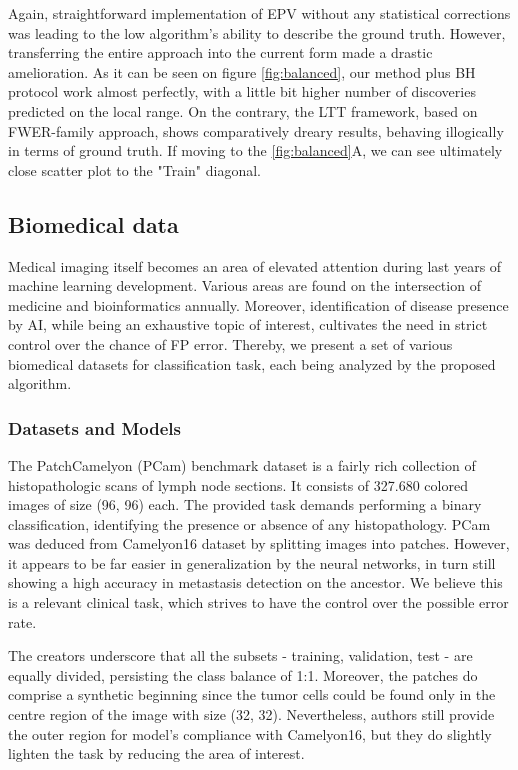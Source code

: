 \documentclass{article}
\begin{document}
Again, straightforward implementation of EPV without any statistical corrections was leading to the low algorithm's ability to describe the ground truth. However, transferring the entire approach into the current form made a drastic amelioration. As it can be seen on figure \ref{fig:balanced}, our method plus BH protocol work almost perfectly, with a little bit higher number of discoveries predicted on the local range. On the contrary, the LTT framework, based on FWER-family approach, shows comparatively dreary results, behaving illogically in terms of ground truth. If moving to the \ref{fig:balanced}A, we can see ultimately close scatter plot to the "Train" diagonal.

\subsection{Biomedical data}

Medical imaging itself becomes an area of elevated attention during last years of machine learning development. Various areas are found on the intersection of medicine and bioinformatics annually. Moreover, identification of disease presence by AI, while being an exhaustive topic of interest, cultivates the need in strict control over the chance of FP error. Thereby, we present a set of various biomedical datasets for classification task, each being analyzed by the proposed algorithm.

\subsubsection{Datasets and Models}

The PatchCamelyon (PCam) benchmark dataset is a fairly rich collection of histopathologic scans of lymph node sections. It consists of 327.680 colored images of size (96, 96) each. The provided task demands performing a binary classification, identifying the presence or absence of any histopathology. PCam was deduced from Camelyon16 dataset by splitting images into patches. However, it appears to be far easier in generalization by the neural networks, in turn still showing a high accuracy in metastasis detection on the ancestor. We believe this is a relevant clinical task, which strives to have the control over the possible error rate.

The creators underscore that all the subsets - training, validation, test - are equally divided, persisting the class balance of 1:1. Moreover, the patches do comprise a synthetic beginning since the tumor cells could be found only in the centre region of the image with size (32, 32). Nevertheless, authors still provide the outer region for model's compliance with Camelyon16, but they do slightly lighten the task by reducing the area of interest.
\end{document}
